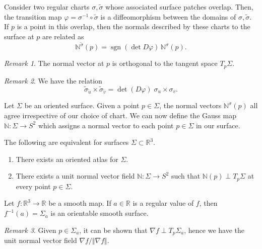 \documentclass[11pt]{article}
\newcommand{\R}{\mathbb{R}}
\newcommand{\N}{\mathbb{N}}
\newcommand{\norm}[1]{\Vert #1 \Vert}
\DeclareMathOperator{\sgn}{sgn}
\newcommand{\grad}{\nabla}
\theoremstyle{definition}
\theoremstyle{remark}
\newtheorem*{remark}{Remark}
\numberwithin{equation}{section}
\begin{document}
    \begin{lemma}
        Consider two regular charts $\sigma, \tilde{\sigma}$ whose associated surface
        patches overlap. Then, the transition map $\varphi = \sigma^{-1}\circ
        \tilde{\sigma}$ is a diffeomorphism between the domains of $\sigma,
        \tilde{\sigma}$. If $p$ is a point in this overlap, then the normals
        described by these charts to the surface at $p$ are related as \[
            \N^{\tilde{\sigma}}(p) = \sgn(\det{D\varphi})\, \N^{\sigma}(p).
        \]
        \begin{remark}
            The normal vector at $p$ is orthogonal to the tangent space $T_p\Sigma$.
        \end{remark}
        \begin{remark}
            We have the relation \[
                \tilde{\sigma}_{\tilde{u}} \times \tilde{\sigma}_{\tilde{v}} =
                \det(D\varphi) \; \sigma_u\times \sigma_v.
            \] 
        \end{remark}
    \end{lemma}

    \begin{definition}
        Let $\Sigma$ be an oriented surface. Given a point $p \in \Sigma$, the normal
        vectors $\N^\sigma(p)$ all agree irrespective of our choice of chart. We can
        now define the Gauss map $\N\colon \Sigma \to S^2$ which assigns a normal
        vector to each point $p \in \Sigma$ in our surface.
    \end{definition}

    \begin{lemma}
        The following are equivalent for surfaces $\Sigma \subset \R^3$.
        \begin{enumerate}
            \itemsep0em
            \item There exists an oriented atlas for $\Sigma$.
            \item There exists a unit normal vector field $\N\colon \Sigma \to S^2$
            such that $\N(p) \perp T_p\Sigma$ at every point $p \in \Sigma$.
        \end{enumerate}
    \end{lemma}

    \begin{theorem}
        Let $f\colon \R^3 \to \R$ be a smooth map. If $a \in \R$ is a regular value
        of $f$, then $f^{-1}(a) = \Sigma_a$ is an orientable smooth surface.
        \begin{remark}
            Given $p \in \Sigma_a$, it can be shown that $\grad{f} \perp
            T_p\Sigma_a$, hence we have the unit normal vector field
            $\grad{f}/\norm{\grad{f}}$.
        \end{remark}
    \end{theorem}
\end{document}
